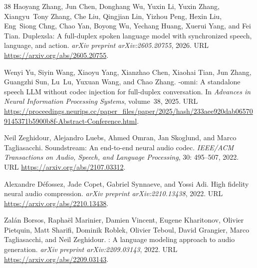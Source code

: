 \documentclass[UTF8,fontset=none,a4paper,10pt]{ctexart}
\begin{document}
{\begin{thebibliography}{38}
Haoyang Zhang, Jun Chen, Donghang Wu, Yuxin Li, Yuxin Zhang, Xiangyu~Tony
  Zhang, Che Liu, Qingjian Lin, Yizhou Peng, Hexin Liu, Eng~Siong Chng, Chao
  Yan, Boyong Wu, Yechang Huang, Xuerui Yang, and Fei Tian.
\newblock Duplexsla: A full-duplex spoken language model with synchronized
  speech, language, and action.
\newblock \emph{arXiv preprint arXiv:2605.20755}, 2026.
\newblock URL \url{https://arxiv.org/abs/2605.20755}.

Wenyi Yu, Siyin Wang, Xiaoyu Yang, Xianzhao Chen, Xiaohai Tian, Jun Zhang,
  Guangzhi Sun, Lu~Lu, Yuxuan Wang, and Chao Zhang.
-omni: A standalone speech {LLM} without codec injection for
  full-duplex conversation.
\newblock In \emph{Advances in Neural Information Processing Systems},
  volume~38, 2025.
\newblock URL
  \url{https://proceedings.neurips.cc/paper_files/paper/2025/hash/233aee920dab065709145371b5900b8f-Abstract-Conference.html}.

Neil Zeghidour, Alejandro Luebs, Ahmed Omran, Jan Skoglund, and Marco
  Tagliasacchi.
\newblock Soundstream: An end-to-end neural audio codec.
\newblock \emph{IEEE/ACM Transactions on Audio, Speech, and Language
  Processing}, 30: 495--507, 2022.
\newblock URL \url{https://arxiv.org/abs/2107.03312}.

Alexandre D{\'e}fossez, Jade Copet, Gabriel Synnaeve, and Yossi Adi.
\newblock High fidelity neural audio compression.
\newblock \emph{arXiv preprint arXiv:2210.13438}, 2022.
\newblock URL \url{https://arxiv.org/abs/2210.13438}.

Zal{\'a}n Borsos, Rapha{\"e}l Marinier, Damien Vincent, Eugene Kharitonov,
  Olivier Pietquin, Matt Sharifi, Dominik Roblek, Olivier Teboul, David
  Grangier, Marco Tagliasacchi, and Neil Zeghidour.
: A language modeling approach to audio generation.
\newblock \emph{arXiv preprint arXiv:2209.03143}, 2022.
\newblock URL \url{https://arxiv.org/abs/2209.03143}.


\end{thebibliography}}
\end{document}
